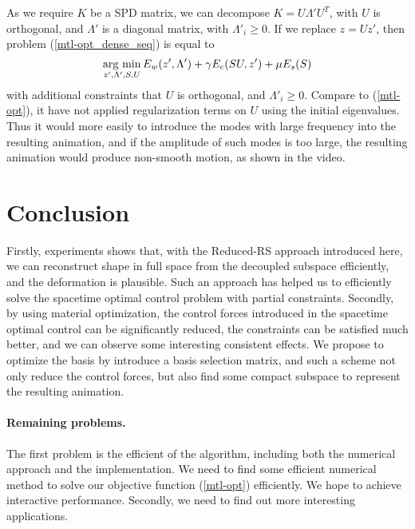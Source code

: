 \documentclass[9pt,twocolumn]{extarticle}
\newcommand{\argmin}{\operatornamewithlimits{arg\ min}}
\begin{document}
As we require $K$ be a SPD matrix, we can decompose $K=U\Lambda' U^T$, with
$U$ is orthogonal, and $\Lambda'$ is a diagonal matrix, with $\Lambda'_i\ge
0$. If we replace $z=Uz'$, then problem (\ref{mtl-opt_dense_seq}) is equal to
\begin{equation} \label{mtl-opt_dense_2}
  \argmin_{z',\Lambda',S,U} E_w(z',\Lambda')+\gamma E_c(SU,z')+\mu E_s(S)
\end{equation}
with additional constraints that $U$ is orthogonal, and
$\Lambda'_i\ge0$. Compare to (\ref{mtl-opt}), it have not applied regularization
terms on $U$ using the initial eigenvalues. Thus it would more easily to
introduce the modes with large frequency into the resulting animation, and if
the amplitude of such modes is too large, the resulting animation would produce
non-smooth motion, as shown in the video.


\section{Conclusion}\label{sec:conclusion}
Firstly, experiments shows that, with the Reduced-RS approach introduced here,
we can reconstruct shape in full space from the decoupled subspace efficiently,
and the deformation is plausible. Such an approach has helped us to efficiently
solve the spacetime optimal control problem with partial constraints. Secondly,
by using material optimization, the control forces introduced in the spacetime
optimal control can be significantly reduced, the constraints can be satisfied
much better, and we can observe some interesting consistent effects. We propose
to optimize the basis by introduce a basis selection matrix, and such a scheme
not only reduce the control forces, but also find some compact subspace to
represent the resulting animation.

\paragraph{Remaining problems.} The first problem is the efficient of the
algorithm, including both the numerical approach and the implementation. We need
to find some efficient numerical method to solve our objective function
(\ref{mtl-opt}) efficiently. We hope to achieve interactive
performance. Secondly, we need to find out more interesting applications.
\end{document}
